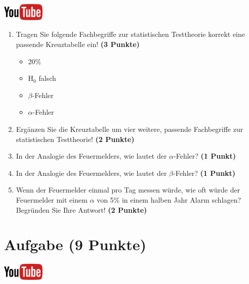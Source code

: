 \documentclass[a4paper, 9pt]{scrartcl}\usepackage[]{graphicx}\usepackage[]{xcolor}
\begin{document}
\hfill\href{https://youtu.be/3DfWs9NNrCk}{\includegraphics[width =
  2cm]{img/youtube}}\\[1Ex]




\begin{enumerate}
\item Tragen Sie folgende Fachbegriffe zur statistischen Testtheorie korrekt eine passende Kreuztabelle ein! \textbf{(3 Punkte)}
  \begin{itemize}
  \item 20\%
  \item H$_0$ falsch
  \item $\beta$-Fehler
  \item $\alpha$-Fehler
  \end{itemize}
\item Erg{\"a}nzen Sie die Kreuztabelle um vier weitere, passende Fachbegriffe zur statistischen Testtheorie! \textbf{(2 Punkte)}
\item In der Analogie des Feuermelders, wie lautet der $\alpha$-Fehler? \textbf{(1 Punkt)}
\item In der Analogie des Feuermelders, wie lautet der $\beta$-Fehler? \textbf{(1 Punkt)}
\item Wenn der Feuermelder einmal pro Tag messen w{\"u}rde, wie oft w{\"u}rde der
  Feuermelder mit einem $\alpha$ von 5\% in einem halben Jahr Alarm schlagen?
  Begr{\"u}nden Sie Ihre Antwort! \textbf{(2 Punkte)}
\end{enumerate}



 
\clearpage

\section{Aufgabe \hfill (9 Punkte)}

\hfill\href{https://youtu.be/32JjH1eyuTU}{\includegraphics[width =
  2cm]{img/youtube}}\\[1Ex]
\end{document}
